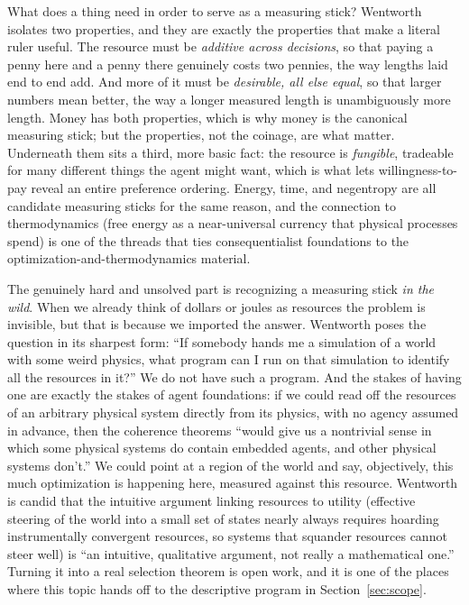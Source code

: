 \documentclass[10pt]{article}
\theoremstyle{definition}
\theoremstyle{remark}
\begin{document}
What does a thing need in order to serve as a measuring stick? Wentworth isolates two properties, and they are exactly the properties that make a literal ruler useful. The resource must be \emph{additive across decisions}, so that paying a penny here and a penny there genuinely costs two pennies, the way lengths laid end to end add. And more of it must be \emph{desirable, all else equal}, so that larger numbers mean better, the way a longer measured length is unambiguously more length. Money has both properties, which is why money is the canonical measuring stick; but the properties, not the coinage, are what matter. Underneath them sits a third, more basic fact: the resource is \emph{fungible}, tradeable for many different things the agent might want, which is what lets willingness-to-pay reveal an entire preference ordering. Energy, time, and negentropy are all candidate measuring sticks for the same reason, and the connection to thermodynamics (free energy as a near-universal currency that physical processes spend) is one of the threads that ties consequentialist foundations to the optimization-and-thermodynamics material.

The genuinely hard and unsolved part is recognizing a measuring stick \emph{in the wild}. When we already think of dollars or joules as resources the problem is invisible, but that is because we imported the answer. Wentworth poses the question in its sharpest form: ``If somebody hands me a simulation of a world with some weird physics, what program can I run on that simulation to identify all the resources in it?'' We do not have such a program. And the stakes of having one are exactly the stakes of agent foundations: if we could read off the resources of an arbitrary physical system directly from its physics, with no agency assumed in advance, then the coherence theorems ``would give us a nontrivial sense in which some physical systems do contain embedded agents, and other physical systems don't.'' We could point at a region of the world and say, objectively, this much optimization is happening here, measured against this resource. Wentworth is candid that the intuitive argument linking resources to utility (effective steering of the world into a small set of states nearly always requires hoarding instrumentally convergent resources, so systems that squander resources cannot steer well) is ``an intuitive, qualitative argument, not really a mathematical one.'' Turning it into a real selection theorem is open work, and it is one of the places where this topic hands off to the descriptive program in Section~\ref{sec:scope}.
\end{document}
